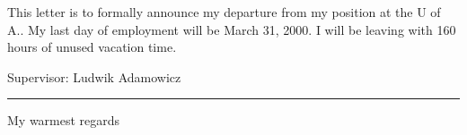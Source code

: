 \documentclass{letter}
\begin{document}
\begin{letter}{}

\opening{}

This letter is to formally announce my departure from my position at
the U of A.. My last day of employment will be March 31, 2000. I will
be leaving with 160 hours of unused vacation time.

\vspace{.5in}

\noindent
Supervisor: Ludwik Adamowicz
\rule{2.5in}{.1pt}
  
\vspace{.5in}  

\closing{My warmest regards}

\end{letter}
\end{document}
